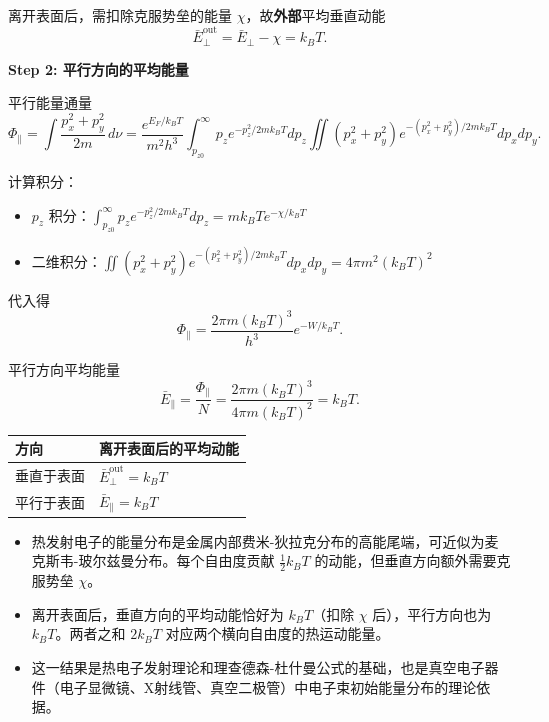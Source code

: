 \begin{derivationbox}[标准解题过程]
离开表面后，需扣除克服势垒的能量 $\chi$，故\textbf{外部}平均垂直动能
\begin{equation}
\boxed{\bar E_\perp^{\text{out}}=\bar E_\perp-\chi=k_BT.}
\end{equation}

\textbf{Step 2: 平行方向的平均能量}

平行能量通量
\begin{equation}
\Phi_\parallel=\int\frac{p_x^2+p_y^2}{2m}\,d\nu
=\frac{e^{E_F/k_BT}}{m^2h^3}\int_{p_{z0}}^\infty p_z e^{-p_z^2/2mk_BT}dp_z
\iint(p_x^2+p_y^2)e^{-(p_x^2+p_y^2)/2mk_BT}dp_xdp_y.
\end{equation}

计算积分：
\begin{itemize}
    \item $p_z$ 积分：$\int_{p_{z0}}^\infty p_z e^{-p_z^2/2mk_BT}dp_z=mk_BT e^{-\chi/k_BT}$
    \item 二维积分：$\iint(p_x^2+p_y^2)e^{-(p_x^2+p_y^2)/2mk_BT}dp_xdp_y=4\pi m^2(k_BT)^2$
\end{itemize}

代入得
\begin{equation}
\Phi_\parallel=\frac{2\pi m(k_BT)^3}{h^3}e^{-W/k_BT}.
\end{equation}

平行方向平均能量
\begin{equation}
\boxed{\bar E_\parallel=\frac{\Phi_\parallel}{N}=\frac{2\pi m(k_BT)^3}{4\pi m(k_BT)^2}=k_BT.}
\end{equation}
\end{derivationbox}

\begin{formulabox}[答案汇总]
\begin{center}
\begin{tabular}{ll}
\toprule
\textbf{方向} & \textbf{离开表面后的平均动能} \\
\midrule
垂直于表面 & $\bar E_\perp^{\text{out}}=k_BT$ \\
平行于表面 & $\bar E_\parallel=k_BT$ \\
\bottomrule
\end{tabular}
\end{center}
\end{formulabox}

\begin{insightbox}[物理图像]
\begin{itemize}
    \item 热发射电子的能量分布是金属内部费米-狄拉克分布的高能尾端，可近似为麦克斯韦-玻尔兹曼分布。每个自由度贡献 $\tfrac12k_BT$ 的动能，但垂直方向额外需要克服势垒 $\chi$。
    \item 离开表面后，垂直方向的平均动能恰好为 $k_BT$（扣除 $\chi$ 后），平行方向也为 $k_BT$。两者之和 $2k_BT$ 对应两个横向自由度的热运动能量。
    \item 这一结果是热电子发射理论和理查德森-杜什曼公式的基础，也是真空电子器件（电子显微镜、X射线管、真空二极管）中电子束初始能量分布的理论依据。
\end{itemize}
\end{insightbox}
